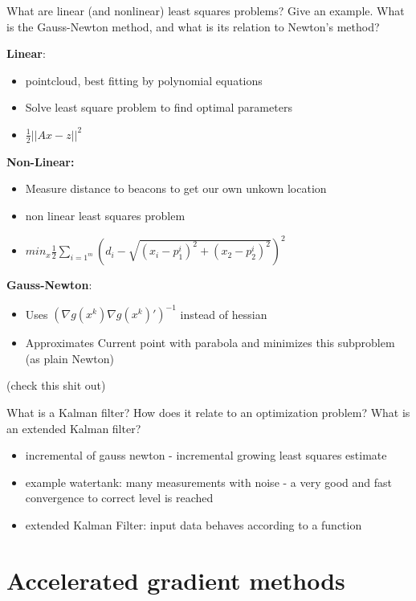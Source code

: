 \documentclass{article}
\begin{document}
\begin{question}
  What are linear (and nonlinear) least squares problems? Give an example.  What is the Gauss-Newton
  method, and what is its relation to Newton’s method?
\end{question}
\textbf{Linear}:
\begin{itemize}
\item pointcloud, best fitting by polynomial equations
\item Solve least square problem to find optimal parameters
\item $\frac{1}{2}|| Ax - z ||^2$
\end{itemize} 
\textbf{Non-Linear:}
\begin{itemize}
\item Measure distance to beacons to get our own unkown location
\item non linear least squares problem
\item $min_x \frac{1}{2} \sum_{i = 1^m} (d_i - \sqrt{(x_i - p_1^i)^2 + (x_2 - p_2^i)^2})^2$
\end{itemize} 
\textbf{Gauss-Newton}:
\begin{itemize}
\item Uses $(\nabla g(x^k)\nabla g(x^k)')^{-1}$ instead of hessian
\item Approximates Current point with parabola and minimizes this subproblem (as plain Newton)
\end{itemize}
(check this shit out)

\begin{question}
  What is a Kalman filter? How does it relate to an optimization problem?  What is an extended
  Kalman filter?
\end{question}
\begin{itemize}
\item incremental of gauss newton - incremental growing least squares estimate
\item example watertank: many measurements with noise - a very good and fast convergence to correct
  level is reached
\item extended Kalman Filter: input data behaves according to a function
\end{itemize}

\section{Accelerated gradient methods}
\end{document}
